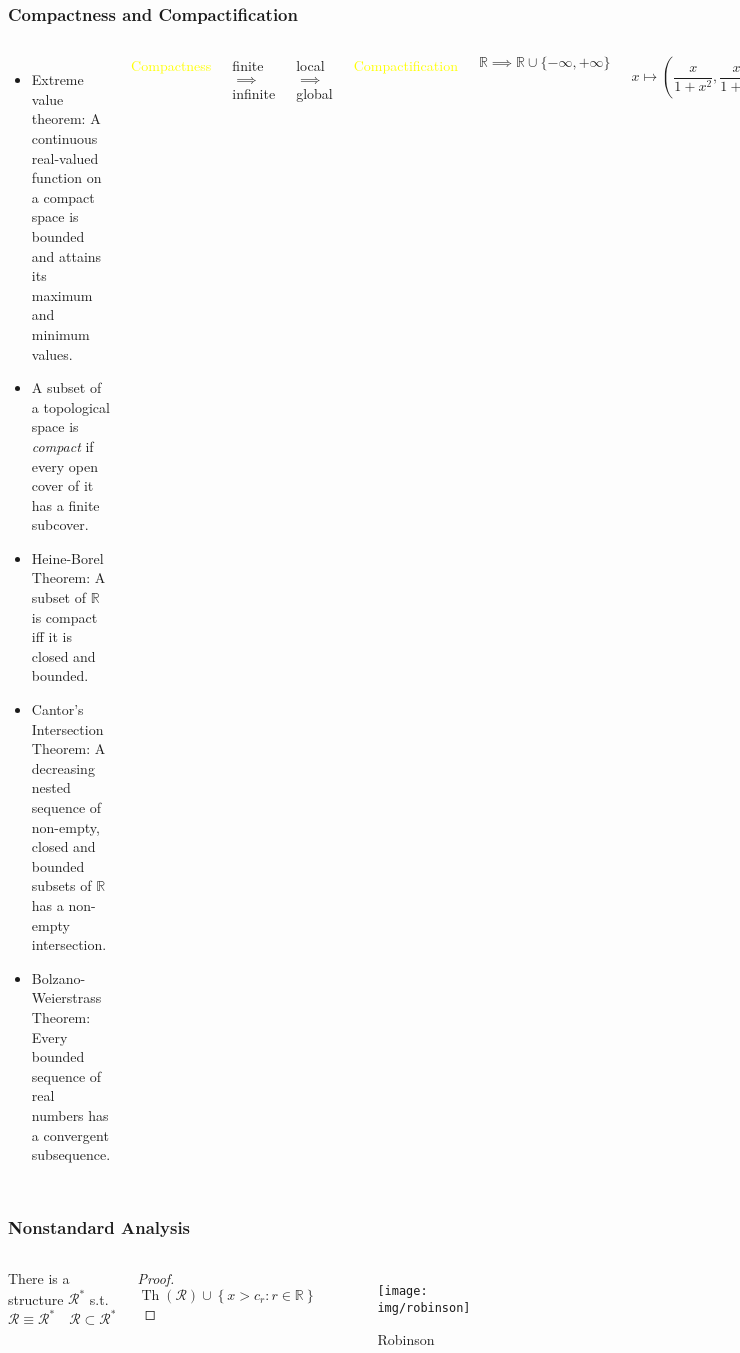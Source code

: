 \documentclass[UTF8,11pt,colorlinks,compress,openany]{beamer}%
\begin{document}
\begin{frame}\frametitle{Compactness and Compactification}
\begin{columns}
\begin{itemize}
	\item Extreme value theorem: A continuous real-valued function on a compact space is bounded and attains its maximum and minimum values.
	\item A subset of a topological space is \emph{compact} if every open cover of it has a finite subcover.
	\item Heine-Borel Theorem: A subset of $\mathbb{R}$ is compact iff it is closed and bounded.
	\item Cantor's Intersection Theorem: A decreasing nested sequence of non-empty, closed and bounded subsets of $\mathbb{R}$ has a non-empty intersection.
	\item Bolzano-Weierstrass Theorem: Every bounded sequence of real numbers has a convergent subsequence.
\end{itemize}
\centerline{\textcolor{yellow}{Compactness}}\vspace*{1ex}
\centerline{finite $\implies$ infinite}
\centerline{local $\implies$ global}\vspace*{2ex}
\centerline{\textcolor{yellow}{Compactification}}
\[\mathbb{R}\implies\mathbb{R}\cup\{-\infty,+\infty\}\]
\[x\mapsto\left(\frac{x}{1+x^2},\frac{x^2}{1+x^2}\right)\]
\end{columns}
\end{frame}

\begin{frame}\frametitle{Nonstandard Analysis}
	\begin{columns}
			\begin{theorem}
				There is a structure $\mathcal{R}^*$ s.t.
				\[\mathcal{R}\equiv\mathcal{R}^*\quad \mathcal{R}\subset\mathcal{R}^*\]
			\end{theorem}
			\begin{proof}
				\[\operatorname{Th}(\mathcal{R})\cup\left\{x>c_r: r\in\mathbb{R}\right\}\]
			\end{proof}
			\begin{figure}
				\texttt{[image: img/robinson]}\caption{Robinson}
			\end{figure}
	\end{columns}
\end{frame}
\end{document}
